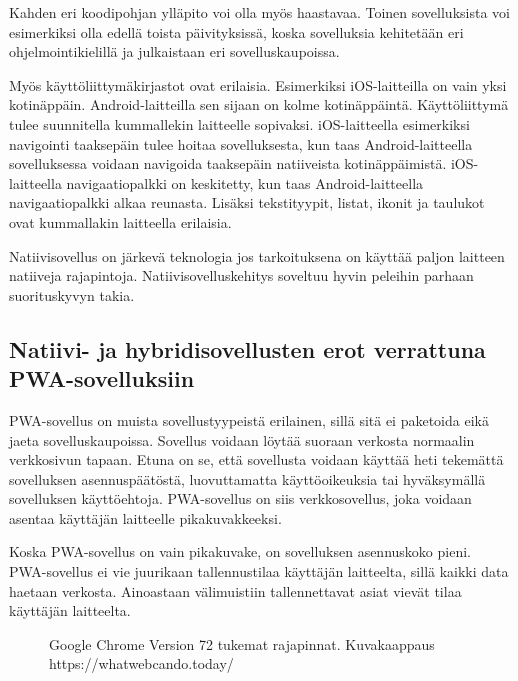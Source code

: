 \documentclass{tktltiki}
\begin{document}
Kahden eri koodipohjan ylläpito voi olla myös haastavaa. Toinen sovelluksista voi esimerkiksi olla edellä toista päivityksissä, koska sovelluksia kehitetään eri ohjelmointikielillä ja julkaistaan eri sovelluskaupoissa.

Myös käyttöliittymäkirjastot ovat erilaisia. Esimerkiksi iOS-laitteilla on vain yksi kotinäppäin. Android-laitteilla sen sijaan on kolme kotinäppäintä. \cite{Sojka} Käyttöliittymä tulee suunnitella kummallekin laitteelle sopivaksi. iOS-laitteella esimerkiksi navigointi taaksepäin tulee hoitaa sovelluksesta, kun taas Android-laitteella sovelluksessa voidaan navigoida taaksepäin natiiveista kotinäppäimistä. iOS-laitteella navigaatiopalkki on keskitetty, kun taas Android-laitteella navigaatiopalkki alkaa reunasta. Lisäksi tekstityypit, listat, ikonit ja taulukot ovat kummallakin laitteella erilaisia.

Natiivisovellus on järkevä teknologia jos tarkoituksena on käyttää paljon laitteen natiiveja rajapintoja. Natiivisovelluskehitys soveltuu hyvin peleihin parhaan suorituskyvyn takia. 

\subsection{Natiivi- ja hybridisovellusten erot verrattuna PWA-sovelluksiin}

PWA-sovellus on muista sovellustyypeistä erilainen, sillä sitä ei paketoida eikä jaeta sovelluskaupoissa. Sovellus voidaan löytää suoraan verkosta normaalin verkkosivun tapaan. Etuna on se, että sovellusta voidaan käyttää heti tekemättä sovelluksen asennuspäätöstä, luovuttamatta käyttöoikeuksia tai hyväksymällä sovelluksen käyttöehtoja. PWA-sovellus on siis verkkosovellus, joka voidaan asentaa käyttäjän laitteelle pikakuvakkeeksi. 

Koska PWA-sovellus on vain pikakuvake, on sovelluksen asennuskoko pieni. PWA-sovellus ei vie juurikaan tallennustilaa käyttäjän laitteelta, sillä kaikki data haetaan verkosta. Ainoastaan välimuistiin tallennettavat asiat vievät tilaa käyttäjän laitteelta.

\begin{figure}[h]
\begin{center}
\caption{Google Chrome Version 72 tukemat rajapinnat. Kuvakaappaus https://whatwebcando.today/ }
\label{Selaimen rajapinnat}
\end{center}
\end{figure}
\clearpage
\end{document}
